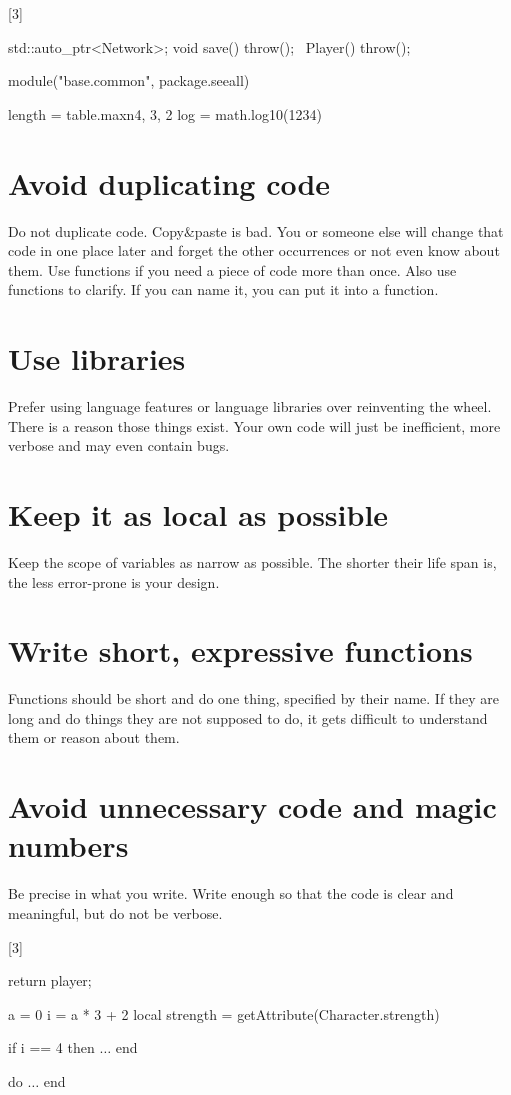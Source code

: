 \documentclass[a4paper,11pt]{scrreprt}
\newcommand{\marginMarker}[1]{%
\marginnote{%
    \hfill%
		\Huge{#1}%
}[3\baselineskip]%
}
\newcommand{\conforming}{%
\marginMarker{\textcolor{green}{\ding{51}}}%
}
\newcommand{\nonconforming}{%
\marginMarker{\textcolor{red}{\ding{55}}}%
}
\begin{document}
\nonconforming{}
\begin{cppBox}
std::auto_ptr<Network>;
void save() throw();
~Player() throw();
\end{cppBox}
\begin{luaBox}
module("base.common", package.seeall)

length = table.maxn{4, 3, 2}
log = math.log10(1234)
\end{luaBox}

\section{Avoid duplicating code}
Do not duplicate code. Copy\&paste is bad. You or someone else will change that code in one place later and forget the other occurrences or not even know about them. Use functions if you need a piece of code more than once. Also use functions to clarify. If you can name it, you can put it into a function.

\section{Use libraries}
Prefer using language features or language libraries over reinventing the wheel. There is a reason those things exist. Your own code will just be inefficient, more verbose and may even contain bugs.

\section{Keep it as local as possible}
Keep the scope of variables as narrow as possible. The shorter their life span is, the less error-prone is your design.

\section{Write short, expressive functions}
Functions should be short and do one thing, specified by their name. If they are long and do things they are not supposed to do, it gets difficult to understand them or reason about them.

\section{Avoid unnecessary code and magic numbers}
Be precise in what you write. Write enough so that the code is clear and meaningful, but do not be verbose.

\conforming{}
\begin{cppBox}
return player;
\end{cppBox}
\begin{luaBox}[mathescape]
a = 0
i = a * 3 + 2
local strength = getAttribute(Character.strength)

if i == 4 then
    $\dots$
end

do
    $\dots$
end
\end{luaBox}
\end{document}
